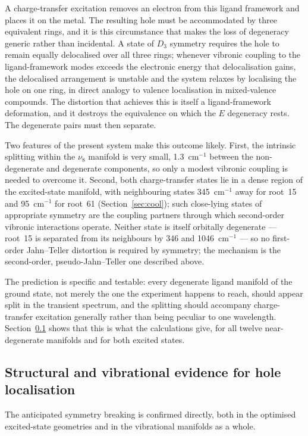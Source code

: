 \documentclass[11pt,a4paper]{article}
\newcommand{\wn}{\ensuremath{\mathrm{cm^{-1}}}}
\begin{document}
A charge-transfer excitation removes an electron from this ligand framework and
places it on the metal. The resulting hole must be accommodated by three
equivalent rings, and it is this circumstance that makes the loss of degeneracy
generic rather than incidental. A state of $D_3$ symmetry requires the hole to
remain equally delocalised over all three rings; whenever vibronic coupling to
the ligand-framework modes exceeds the electronic energy that delocalisation
gains, the delocalised arrangement is unstable and the system relaxes by
localising the hole on one ring, in direct analogy to valence localisation in
mixed-valence compounds. The distortion that achieves this is itself a
ligand-framework deformation, and it destroys the equivalence on which the $E$
degeneracy rests. The degenerate pairs must then separate.

Two features of the present system make this outcome likely. First, the
intrinsic splitting within the $\nu_8$ manifold is very small, 1.3~\wn{}
between the non-degenerate and degenerate components, so only a modest
vibronic coupling is needed to overcome it. Second, both charge-transfer
states lie in a dense region of the excited-state manifold, with neighbouring
states 345~\wn{} away for root~15 and 95~\wn{} for root~61
(Section~\ref{sec:cool}); such close-lying states of appropriate symmetry are
the coupling partners through which second-order vibronic interactions operate.
Neither state is itself orbitally degenerate --- root~15 is separated from its
neighbours by 346 and 1046~\wn{} --- so no first-order Jahn--Teller distortion is
required by symmetry; the mechanism is the second-order, pseudo-Jahn--Teller
one described above.

The prediction is specific and testable: every degenerate ligand manifold of
the ground state, not merely the one the experiment happens to reach, should
appear split in the transient spectrum, and the splitting should accompany
charge-transfer excitation generally rather than being peculiar to one
wavelength. Section~\ref{sec:loc} shows that this is what the calculations
give, for all twelve near-degenerate manifolds and for both excited states.

\subsection{Structural and vibrational evidence for hole localisation}
\label{sec:loc}

The anticipated symmetry breaking is confirmed directly, both in the optimised
excited-state geometries and in the vibrational manifolds as a whole.
\end{document}
